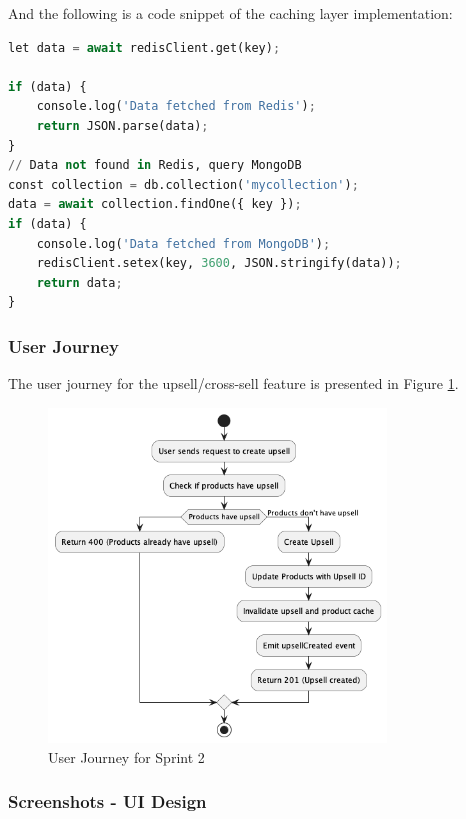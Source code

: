 \newpage

And the following is a code snippet of the caching layer implementation:

\begin{lstlisting}[language=Python, caption=Redis Caching Layer Implementation, label=lst:redis_caching_layer, frame=single, framerule=0.5pt]
let data = await redisClient.get(key);

if (data) {
    console.log('Data fetched from Redis');
    return JSON.parse(data);
}
// Data not found in Redis, query MongoDB
const collection = db.collection('mycollection');
data = await collection.findOne({ key });
if (data) {
    console.log('Data fetched from MongoDB');
    redisClient.setex(key, 3600, JSON.stringify(data));
    return data;
}
\end{lstlisting}

\subsubsection{User Journey}

The user journey for the upsell/cross-sell feature is presented in Figure \ref{fig:user_journey_sprint2}.

\begin{figure}[H]
    \centering
    \includegraphics[width=0.8\textwidth]{images/sprintTwoActivity.png}
    \caption{User Journey for Sprint 2}
    \label{fig:user_journey_sprint2}
\end{figure}

\subsubsection{Screenshots - UI Design}

